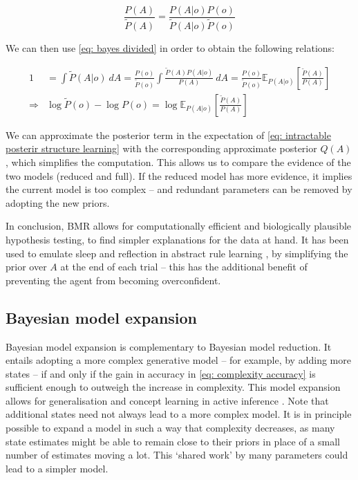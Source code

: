 \documentclass[review,12pt,authoryear]{elsarticle}
\newcommand{\E}{\mathbb E}
\begin{document}
	 \begin{equation}
\label{eq: bayes divided}
	     \frac{P(A)}{\tilde P(A)} = \frac{P(A|o)P(o)}{\tilde P(A|o)\tilde P(o)} 
	 \end{equation}
  	
 We can then use \eqref{eq: bayes divided} in order to obtain the following relations:
 
 \begin{align}
        1 &= \int \tilde P(A|o)\: dA =\frac{P(o)}{\tilde P(o)}\int \frac{\tilde P(A) P(A|o)}{P(A)} \:dA = \frac{P(o)}{\tilde P(o)}\E_{P(A|o)}\left[\frac{\tilde P(A)}{P(A)}\right] \\
        \Rightarrow &\log \tilde P(o) -\log  P(o) =\log \E_{P(A|o)}\left[\frac{\tilde P(A)}{P(A)}\right] \label{eq: intractable posterir structure learning}
 \end{align}

We can approximate the posterior term in the expectation of \eqref{eq: intractable posterir structure learning} with the corresponding approximate posterior $Q(A)$, which simplifies the computation. This allows us to compare the evidence of the two models (reduced and full). If the reduced model has more evidence, it implies the current model is too complex – and redundant parameters can be removed by adopting the new priors.

In conclusion, BMR allows for computationally efficient and biologically plausible hypothesis testing, to find simpler explanations for the data at hand. It has been used to emulate sleep and reflection in abstract rule learning \citep{fristonActiveInferenceCuriosity2017}, by simplifying the prior over $A$ at the end of each trial -- this has the additional benefit of preventing the agent from becoming overconfident.

\subsection{Bayesian model expansion}

Bayesian model expansion is complementary to Bayesian model reduction. It entails adopting a more complex generative model -- for example, by adding more states -- if and only if the gain in accuracy in \eqref{eq: complexity accuracy} is sufficient enough to outweigh the increase in complexity. This model expansion allows for generalisation and concept learning in active inference \citep{smithActiveInferenceModel2019}. Note that additional states need not always lead to a more complex model. It is in principle possible to expand a model in such a way that complexity decreases, as many state estimates might be able to remain close to their priors in place of a small number of estimates moving a lot. This ‘shared work’ by many parameters could lead to a simpler model.
\end{document}
